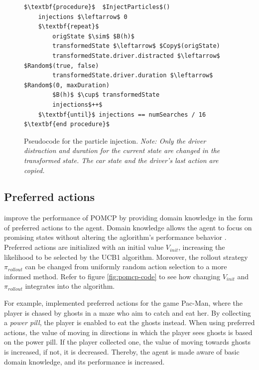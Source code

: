 \begin{figure}[htbp]
\lstset{basicstyle=\rmfamily\footnotesize,breaklines=true}
\begin{lstlisting}[mathescape=true]
$\textbf{procedure}$  $InjectParticles$()
    injections $\leftarrow$ 0
    $\textbf{repeat}$
        origState $\sim$ $B(h)$
        transformedState $\leftarrow$ $Copy$(origState)
        transformedState.driver.distracted $\leftarrow$ $Random$(true, false)
        transformedState.driver.duration $\leftarrow$ $Random$(0, maxDuration)
        $B(h)$ $\cup$ transformedState
        injections$++$
    $\textbf{until}$ injections == numSearches / 16
$\textbf{end procedure}$
\end{lstlisting}
\caption[Pseudocode for the particle injection]{Pseudocode for the particle injection. \emph{Note: Only the driver distraction and duration for the current state are changed in the transformed state. The car state and the driver's last action are copied.}}
\label{fig:code-part-inj}
\end{figure}


\subsection{Preferred actions}
\label{sec:preferred_actions}

\cite{pomcp} improve the performance of POMCP by providing domain knowledge in the form of preferred actions to the agent. Domain knowledge allows the agent to focus on promising states without altering the aglorithm's performance behavior \parencite{pomcp}. Preferred actions are initialized with an initial value $V_{init}$, increasing the likelihood to be selected by the UCB1 algorithm. Moreover, the rollout strategy $\pi_{rollout}$ can be changed from uniformly random action selection to a more informed method. Refer to figure \ref{fig:pomcp-code} to see how changing $V_{init}$ and $\pi_{rollout}$ integrates into the algorithm.

For example, \cite{pomcp} implemented preferred actions for the game Pac-Man, where the player is chased by ghosts in a maze who aim to catch and eat her. By collecting a \emph{power pill}, the player is enabled to eat the ghosts instead. When using preferred actions, the value of moving in directions in which the player sees ghosts is based on the power pill. If the player collected one, the value of moving towards ghosts is increased, if not, it is decreased. Thereby, the agent is made aware of basic domain knowledge, and its performance is increased.

